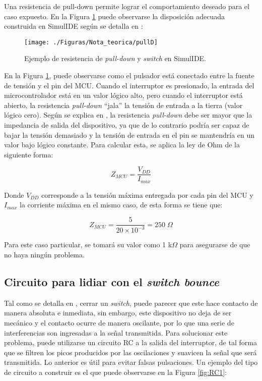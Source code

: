 Una resistencia de pull-down permite lograr el comportamiento deseado para el caso expuesto. En la Figura \ref{fig:pullD} puede observarse la disposición adecuada construida en SimulIDE según se detalla en \cite{pullU}: 

\begin{figure}[H]
\centering
\texttt{[image: ./Figuras/Nota\_teorica/pullD]}
\caption{Ejemplo de resistencia de \textit{pull-down} y \textit{switch} en SimulIDE.}
\label{fig:pullD}
\end{figure}

En la Figura \ref{fig:pullD}, puede observarse como el pulsador está conectado entre la fuente de tensión y el pin del MCU. Cuando el interruptor es presionado, la entrada del microcontrolador está en un valor lógico alto, pero cuando el interruptor está abierto, la resistencia \textit{pull-down} ``jala'' la tensión de entrada a la tierra (valor lógico cero). Según se explica en \cite{pullU}, la resistencia \textit{pull-down} debe ser mayor que la impedancia de salida del dispositivo, ya que de lo contrario podría ser capaz de bajar la tensión demasiado y la tensión de entrada en el pin se mantendría en un valor bajo lógico constante. Para calcular esta, se aplica la ley de Ohm de la siguiente forma: 

\begin{equation}
    Z_{MCU} = \frac{V_{DD}}{I_{max}}
\end{equation}

Donde $V_{DD}$ corresponde a la tensión máxima entregada por cada pin del MCU y $I_{max}$ la corriente máxima en el mismo caso, de esta forma se tiene que: 

\begin{equation}
    Z_{MCU} = \frac{5}{20 \times 10^{-3}} = 250 \; \Omega
\end{equation}

Para este caso particular, se tomará su valor como 1 k$\Omega$ para asegurarse de que no haya ningún problema.

\subsection{Circuito para lidiar con el \textit{switch bounce}} \label{sec:cir1}
Tal como se detalla en \cite{RC}, cerrar un \textit{switch}, puede parecer que este hace contacto de manera absoluta e inmediata, sin embargo, este dispositivo no deja de ser mecánico y el contacto ocurre de manera oscilante, por lo que una serie de interferencias son ingresadas a la señal transmitida. Para solucionar este problema, puede utilizarse un circuito RC a la salida del interruptor, de tal forma que se filtren los picos producidos por las oscilaciones y suavicen la señal que será transmitida. Lo anterior es útil para evitar falsas pulsaciones. Un ejemplo del tipo de circuito a construir es el que puede observarse en la Figura \ref{fig:RC1}: 

